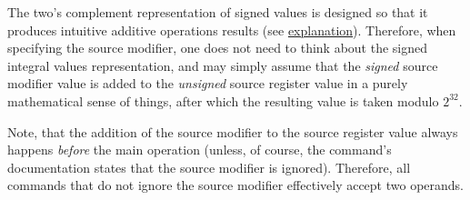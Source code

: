 The two's complement representation of signed values is designed so that it produces intuitive additive operations results (see \href{https://en.wikipedia.org/wiki/Two\%27s_complement#Addition}{explanation}).
Therefore, when specifying the source modifier, one does not need to think about the signed integral values representation, and may simply assume that the \textit{signed} source modifier value is added to the \textit{unsigned} source register value in a purely mathematical sense of things, after which the resulting value is taken modulo $2^{32}$.

Note, that the addition of the source modifier to the source register value always happens \textit{before} the main operation (unless, of course, the command's documentation states that the source modifier is ignored). Therefore, all  commands that do not ignore the source modifier effectively accept two  operands.